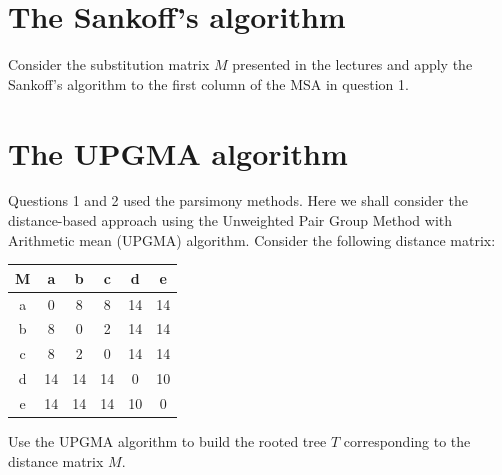 \documentclass[a4paper,11pt]{article}
\begin{document}
\section{The Sankoff's algorithm}

\noindent Consider the substitution matrix $M$ presented in the lectures and apply the Sankoff's algorithm to the first column of the MSA in question 1.

\section{The UPGMA algorithm}

\noindent Questions 1 and 2 used the parsimony methods. Here we shall consider the distance-based approach using the Unweighted Pair Group Method with Arithmetic mean (UPGMA) algorithm. Consider the following distance matrix:

\begin{table}[h!]
\begin{center}
\begin{tabular}{|c|c|c|c|c|c|}
\hline
 M & a & b & c & d & e\\
\hline
a & 0 & 8 & 8 & 14 & 14\\
\hline
b & 8 & 0 & 2 & 14 & 14\\
\hline
c & 8 & 2 & 0 & 14 & 14\\
\hline
d & 14 & 14 & 14 & 0 & 10\\
\hline
e & 14 & 14 & 14 & 10 & 0\\
 \hline
\end{tabular}
\end{center}
\end{table}

\noindent Use the UPGMA algorithm to build the rooted tree $T$ corresponding to the distance matrix $M$.
\end{document}
